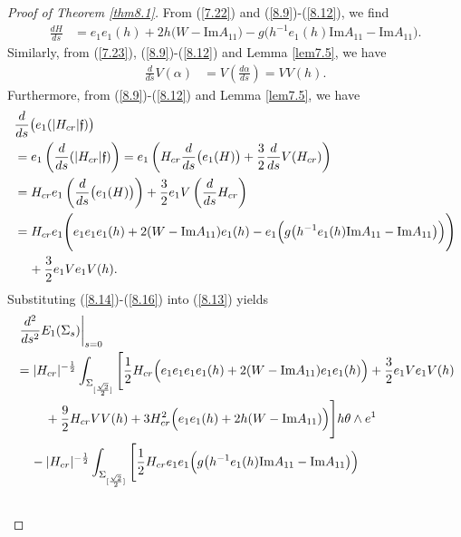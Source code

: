 \documentclass{amsart}
\theoremstyle{Corollary}
\numberwithin{equation}{section}
\begin{document}
\begin{proof}[Proof of Theorem \ref{thm8.1}]
From (\ref{7.22}) and (\ref{8.9})-(\ref{8.12}), 
we find
\begin{equation}\label{8.14}
\begin{split}
\frac{dH}{ds}
&=e_1e_1(h) +2h\big( W- \mbox{Im}A_{11}\big)
-g\big(h^{-1}e_1(h)\mbox{Im}A_{11}-\mbox{Im}A_{11}\big).
\end{split}
\end{equation}
Similarly, from (\ref{7.23}), (\ref{8.9})-(\ref{8.12}) and Lemma \ref{lem7.5}, 
we have 
\begin{align}\label{8.15}
\frac{d}{ds}V(\alpha)
&=V\left(\frac{d\alpha}{ds}\right)
=VV(h).
\end{align}
Furthermore, from (\ref{8.9})-(\ref{8.12}) and Lemma \ref{lem7.5}, 
we have 
\begin{equation}\label{8.16}
\begin{split}
&\frac{d}{ds}\big(e_1(|H_{cr}|\mathfrak{f})\big)\\
&=e_1\left(\frac{d}{ds}(|H_{cr}|\mathfrak{f})\right)=e_1\left(H_{cr}\frac{d}{ds}\big(e_1(H)\big)+\frac{3}{2}\frac{d}{ds}V(H_{cr})\right)\\
&=H_{cr}e_1\left(\frac{d}{ds}\big(e_1(H)\big)\right)+\frac{3}{2}e_1V\left(\frac{d}{ds} H_{cr}\right)\\
&=H_{cr}e_1\Bigg(e_1e_1e_1(h)+2(W-\mbox{Im}A_{11})e_1(h)-e_1\Big(g\big(h^{-1}e_1(h)\mbox{Im}A_{11}-\mbox{Im}A_{11}\big)\Big)\Bigg)\\
&\hspace{4mm}+\frac{3}{2}e_1Ve_1V(h).
\end{split}
\end{equation}
Substituting   (\ref{8.14})-(\ref{8.16}) into (\ref{8.13})
yields 
\begin{equation}\label{8.17}
\begin{split}
&\left.\frac{d^2}{ds^2}E_1(\Sigma_s)\right|_{s=0}\\ &=
|H_{cr}|^{-\frac{1}{2}}\int_{\Sigma_{[\frac{\sqrt{2}}{2}]}}
\Bigg[\frac{1}{2}H_{cr}\Big(e_1e_1e_1e_1(h)+2(W-\mbox{Im}A_{11})e_1e_1(h)\Big)
+\frac{3}{2}e_1V e_1V(h)\\
&\hspace{8mm}+\frac{9}{2}H_{cr}VV(h)
+3H_{cr}^2\Big(e_1e_1(h)+2h(W-\mbox{Im}A_{11})\Big)
\Bigg]h\theta\wedge e^1\\
&\hspace{4mm}-|H_{cr}|^{-\frac{1}{2}}\int_{\Sigma_{[\frac{\sqrt{2}}{2}]}}
\Bigg[\frac{1}{2}H_{cr}e_1e_1\Big(g\big(h^{-1}e_1(h)\mbox{Im}A_{11}-\mbox{Im}A_{11}\big)\Big)\\
&\hspace{8mm}

\end{split}
\end{equation}
\end{proof}
\end{document}
